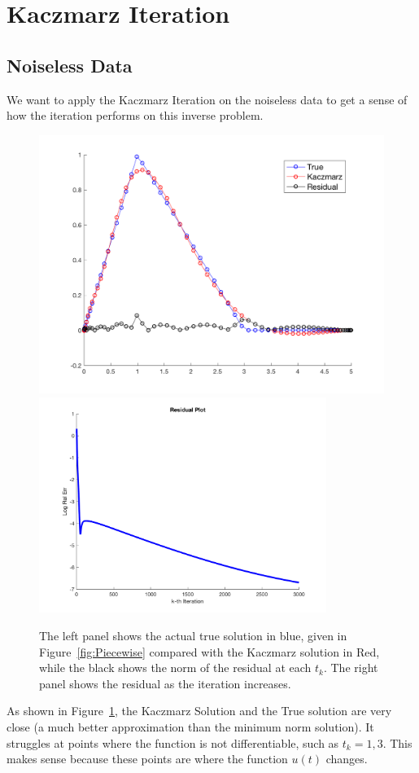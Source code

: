 \documentclass{article}
\begin{document}
\section{Kaczmarz Iteration}

\subsection{Noiseless Data}

We want to apply the Kaczmarz Iteration on the noiseless data to get a sense of how the iteration performs on this inverse problem. 

\begin{figure}[H]
    \centerline{
    \includegraphics[height = 7 cm]{Noiseless.png}\includegraphics[height = 7cm]{Residuals-Noiseless.png}
    }
    \caption{\label{fig:Noiseless} The left panel shows the actual true solution in blue, given in Figure~\ref{fig:Piecewise} compared with the Kaczmarz solution in Red, while the black shows the norm of the residual at each $t_k$. The right panel shows the residual as the iteration increases.}
\end{figure}

As shown in Figure~\ref{fig:Noiseless}, the Kaczmarz Solution and the True solution are very close (a much better approximation than the minimum norm solution). It struggles at points where the function is not differentiable, such as $t_{k} = 1, 3$. This makes sense because these points are where the function $u(t)$ changes. 
\end{document}

